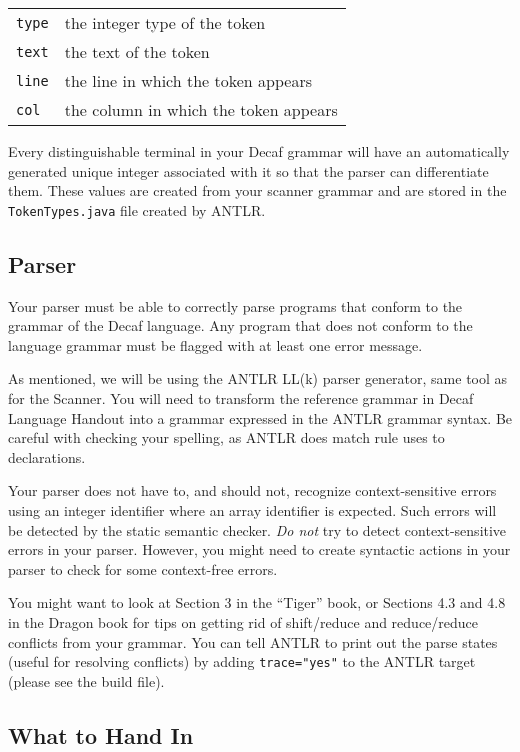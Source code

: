 \begin{tabular}{ll}
   \texttt{type}  & the integer type of the token\\
   \texttt{text}  & the text of the token\\
   \texttt{line}  & the line in which the token appears\\
   \texttt{col}   & the column in which the token appears\\
\end{tabular}

Every distinguishable terminal in your Decaf grammar will have an
automatically generated unique integer associated with it so that
the parser can differentiate them.  These values are created from
your scanner grammar and are stored in the {\tt *TokenTypes.java}
file created by ANTLR.

\subsection*{Parser}

Your parser must be able to correctly parse programs that conform to
the grammar of the Decaf language.  Any program that does not conform
to the language grammar must be flagged with at least one error
message.

As mentioned, we will be using the ANTLR LL(k) parser generator, same
tool as for the Scanner. You will need to transform the reference grammar
in Decaf Language Handout into a grammar expressed in the ANTLR grammar
syntax. Be careful with checking your spelling, as ANTLR does match rule
uses to declarations.

Your parser does not have to, and should not, recognize
context-sensitive errors \eg using an integer identifier where an
array identifier is expected.  Such errors will be detected by the
static semantic checker.  {\it Do not} try to detect
context-sensitive errors in your parser.  However, you might need to
create syntactic actions in your parser to check for some
context-free errors.

You might want to look at Section 3 in the ``Tiger'' book, or
Sections 4.3 and 4.8 in the Dragon book for tips on getting rid of
shift/reduce and reduce/reduce conflicts from your grammar.  You can
tell ANTLR to print out the parse states (useful for resolving
conflicts) by adding {\tt trace="yes"} to the ANTLR target (please
see the build file).

\newpage

\subsection*{What to Hand In}

